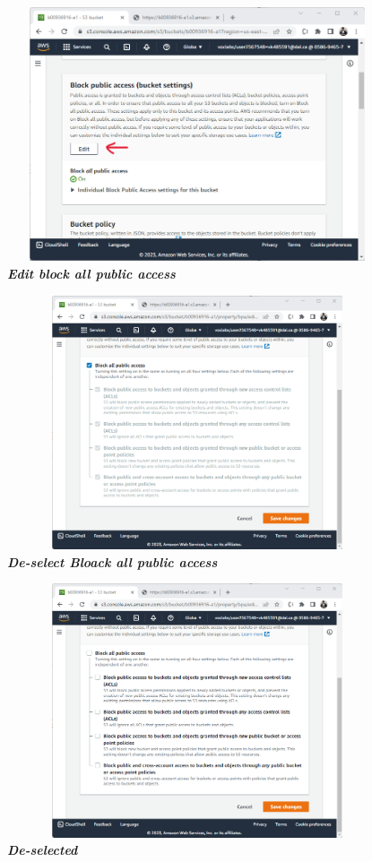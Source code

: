 \begin{figure}[htp]
    \centering
    \includegraphics[scale=1, width=15cm,height=7.5cm]{PROBLEM 2/Snaps/7. Edit block public access.png}
    \caption{\textbf{\textit{ Edit block all public access}}}
    \label{fig:edit_block}
\end{figure}

\begin{figure}[htp]
    \centering
    \includegraphics[scale=1, width=15cm,height=7.5cm]{PROBLEM 2/Snaps/8.1 De-select Block all public access.png}
    \caption{\textbf{\textit{De-select Bloack all public access }}}
    \label{fig:deselect_block}
\end{figure}

\begin{figure}[htp]
    \centering
    \includegraphics[scale=1, width=15cm,height=7.5cm]{PROBLEM 2/Snaps/8.2 De-selected.png}
    \caption{\textbf{\textit{De-selected}}}
    \label{fig:after_deselect}
\end{figure}

